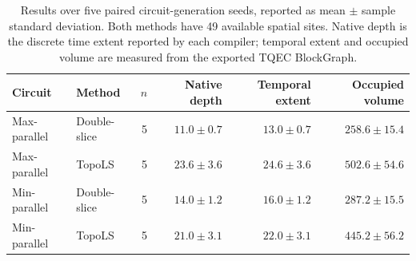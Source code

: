 \begin{table}[t]
    \centering
    \setlength{\tabcolsep}{10pt}
    \caption{Results over five paired circuit-generation seeds, reported as mean $\pm$ sample standard deviation.
    Both methods have 49 available spatial sites.
    Native depth is the discrete time extent reported by each compiler; temporal extent and occupied volume are measured from the exported TQEC BlockGraph.}
    \label{tab:topols_seed_sweep}
    \begin{tabular}{llrrrr}
        \toprule
        Circuit & Method & $n$ & Native depth & Temporal extent & Occupied volume \\
        \midrule
        Max-parallel & Double-slice & 5 & $11.0 \pm 0.7$ & $13.0 \pm 0.7$ & $258.6 \pm 15.4$ \\
        Max-parallel & TopoLS & 5 & $23.6 \pm 3.6$ & $24.6 \pm 3.6$ & $502.6 \pm 54.6$ \\
        Min-parallel & Double-slice & 5 & $14.0 \pm 1.2$ & $16.0 \pm 1.2$ & $287.2 \pm 15.5$ \\
        Min-parallel & TopoLS & 5 & $21.0 \pm 3.1$ & $22.0 \pm 3.1$ & $445.2 \pm 56.2$ \\
        \bottomrule
    \end{tabular}
\end{table}

